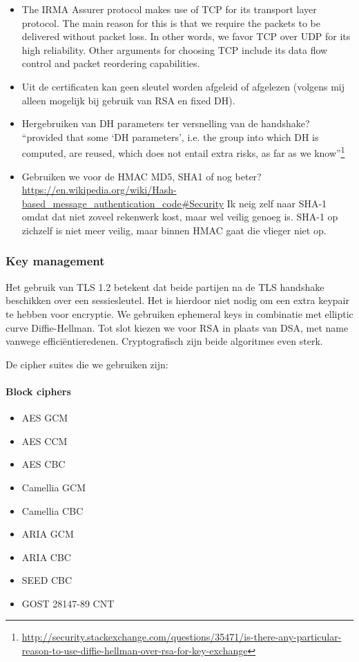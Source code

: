\begin{itemize}
  \item The IRMA Assurer protocol makes use of TCP for its transport layer protocol. The main reason for this is that we require the packets to be delivered without packet loss. In other words, we favor TCP over UDP for its high reliability. Other arguments for choosing TCP include its data flow control and packet reordering capabilities.
  \item Uit de certificaten kan geen sleutel worden afgeleid of afgelezen (volgens mij alleen mogelijk bij gebruik van RSA en fixed DH).
  \item Hergebruiken van DH parameters ter versnelling van de handshake? ``provided that some `DH parameters', i.e. the group into which DH is computed, are reused, which does not entail extra risks, as far as we know''\footnote{\url{http://security.stackexchange.com/questions/35471/is-there-any-particular-reason-to-use-diffie-hellman-over-rsa-for-key-exchange}}
  \item Gebruiken we voor de HMAC MD5, SHA1 of nog beter? \url{https://en.wikipedia.org/wiki/Hash-based_message_authentication_code#Security} Ik neig zelf naar SHA-1 omdat dat niet zoveel rekenwerk kost, maar wel veilig genoeg is. SHA-1 op zichzelf is niet meer veilig, maar binnen HMAC gaat die vlieger niet op.
\end{itemize}

\subsubsection{Key management}
Het gebruik van TLS 1.2 betekent dat beide partijen na de TLS handshake beschikken over een sessiesleutel. Het is hierdoor niet nodig om een extra keypair te hebben voor encryptie. We gebruiken ephemeral keys in combinatie met elliptic curve Diffie-Hellman. Tot slot kiezen we voor RSA in plaats van DSA, met name vanwege efficiëntieredenen. Cryptografisch zijn beide algoritmes even sterk. 

De cipher suites die we gebruiken zijn:

\paragraph{Block ciphers}
\begin{itemize}
	\item AES GCM
  \item AES CCM
  \item AES CBC
  \item Camellia GCM
  \item Camellia CBC
  \item ARIA GCM
  \item ARIA CBC
  \item SEED CBC
  \item GOST 28147-89 CNT
\end{itemize}


